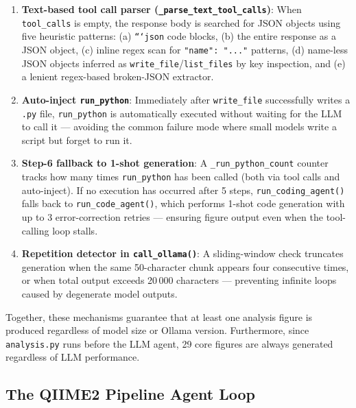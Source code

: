 \documentclass[12pt, a4paper]{article}
\begin{document}
\begin{enumerate}[leftmargin=2em]
  \item \textbf{Text-based tool call parser (\texttt{\_parse\_text\_tool\_calls})}:
    When \texttt{tool\_calls} is empty, the response body is searched
    for JSON objects using five heuristic patterns:
    (a) \texttt{```json} code blocks,
    (b) the entire response as a JSON object,
    (c) inline regex scan for \texttt{"name": "..."} patterns,
    (d) name-less JSON objects inferred as \texttt{write\_file}/\texttt{list\_files}
        by key inspection, and
    (e) a lenient regex-based broken-JSON extractor.

  \item \textbf{Auto-inject \texttt{run\_python}}:
    Immediately after \texttt{write\_file} successfully writes a
    \texttt{.py} file, \texttt{run\_python} is automatically executed
    without waiting for the LLM to call it --- avoiding the common
    failure mode where small models write a script but forget to run it.

  \item \textbf{Step-6 fallback to 1-shot generation}:
    A \texttt{\_run\_python\_count} counter tracks how many times
    \texttt{run\_python} has been called (both via tool calls and
    auto-inject). If no execution has occurred after 5 steps,
    \texttt{run\_coding\_agent()} falls back to \texttt{run\_code\_agent()},
    which performs 1-shot code generation with up to 3 error-correction
    retries --- ensuring figure output even when the tool-calling loop stalls.

  \item \textbf{Repetition detector in \texttt{call\_ollama()}}:
    A sliding-window check truncates generation when the same 50-character
    chunk appears four consecutive times, or when total output exceeds
    20\,000 characters --- preventing infinite loops caused by degenerate
    model outputs.
\end{enumerate}

Together, these mechanisms guarantee that at least one analysis figure
is produced regardless of model size or Ollama version.
Furthermore, since \texttt{analysis.py} runs before the LLM agent,
29 core figures are always generated regardless of LLM performance.

\subsection{The QIIME2 Pipeline Agent Loop}
\end{document}
